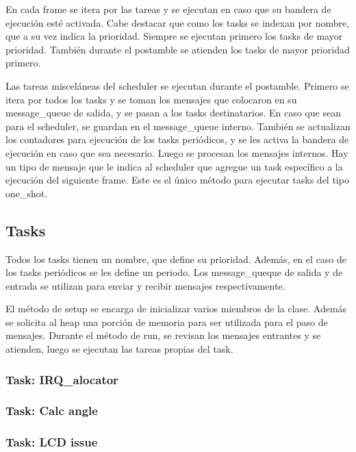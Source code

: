 En cada frame se itera por las tareas y se ejecutan en caso que su bandera de ejecución esté
activada. Cabe destacar que como los tasks se indexan por nombre, que a su vez indica la
prioridad. Siempre se ejecutan primero los tasks de mayor prioridad. También durante el postamble se
atienden los tasks de mayor prioridad primero. 

Las tareas misceláneas del scheduler se ejecutan durante el postamble. Primero se itera por todos
los tasks y se toman los mensajes que colocaron en su message\_queue de salida, y se pasan a los
tasks destinatarios. En caso que sean para el scheduler, se guardan en el message\_queue
interno. También se actualizan los contadores para ejecución de los tasks periódicos, y se les
activa la bandera de ejecución en caso que sea necesario. Luego se procesan los mensajes internos.
Hay un tipo de mensaje que le indica al scheduler que agregue un task específico a la ejecución del
siguiente frame. Este es el único método para ejecutar tasks del tipo one\_shot.


\subsection{Tasks}
\label{sec:tasks}

Todos los tasks tienen un nombre, que define su prioridad. Además, en el caso de los tasks
periódicos se les define un periodo. Los message\_queque de salida y de entrada se utilizan para
enviar y recibir mensajes respectivamente.

El método de setup se encarga de inicializar varios miembros de la clase. Además se solicita al heap
una porción de memoria para ser utilizada para el paso de mensajes. Durante el método de run, se
revisan los mensajes entrantes y se atienden, luego se ejecutan las tareas propias del task.

\subsubsection{Task: IRQ\_alocator}
\label{sec:IRQ_allocator}

\subsubsection{Task: Calc angle}
\label{sec:calc_angle}


\subsubsection{Task: LCD issue}
\label{sec:lcd_issue}
